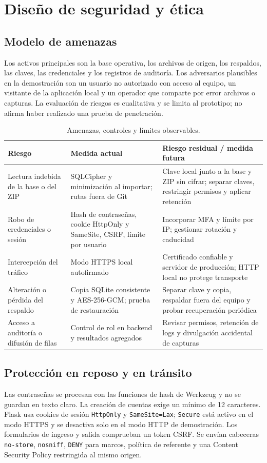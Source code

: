 \documentclass[12pt,a4paper]{article}
\begin{document}
\section{Diseño de seguridad y ética}
\subsection{Modelo de amenazas}
Los activos principales son la base operativa, los archivos de origen, los respaldos, las claves, las credenciales y los registros de auditoría. Los adversarios plausibles en la demostración son un usuario no autorizado con acceso al equipo, un visitante de la aplicación local y un operador que comparte por error archivos o capturas. La evaluación de riesgos es cualitativa y se limita al prototipo; no afirma haber realizado una prueba de penetración.

\begin{table}[H]
\centering\footnotesize
\begin{tabularx}{\textwidth}{P{2.7cm}Y Y}
\toprule
Riesgo & Medida actual & Riesgo residual / medida futura\\
\midrule
Lectura indebida de la base o del ZIP & SQLCipher y minimización al importar; rutas fuera de Git & Clave local junto a la base y ZIP sin cifrar; separar claves, restringir permisos y aplicar retención\\
Robo de credenciales o sesión & Hash de contraseñas, cookie HttpOnly y SameSite, CSRF, límite por usuario & Incorporar MFA y límite por IP; gestionar rotación y caducidad\\
Intercepción del tráfico & Modo HTTPS local autofirmado & Certificado confiable y servidor de producción; HTTP local no protege transporte\\
Alteración o pérdida del respaldo & Copia SQLite consistente y AES-256-GCM; prueba de restauración & Separar clave y copia, respaldar fuera del equipo y probar recuperación periódica\\
Acceso a auditoría o difusión de filas & Control de rol en backend y resultados agregados & Revisar permisos, retención de logs y divulgación accidental de capturas\\
\bottomrule
\end{tabularx}
\caption{Amenazas, controles y límites observables.}
\end{table}

\subsection{Protección en reposo y en tránsito}
Las contraseñas se procesan con las funciones de hash de Werkzeug y no se guardan en texto claro. La creación de cuentas exige un mínimo de 12 caracteres. Flask usa cookies de sesión \texttt{HttpOnly} y \texttt{SameSite=Lax}; \texttt{Secure} está activo en el modo HTTPS y se desactiva solo en el modo HTTP de demostración. Los formularios de ingreso y salida comprueban un token CSRF. Se envían cabeceras \texttt{no-store}, \texttt{nosniff}, \texttt{DENY} para marcos, política de referente y una Content Security Policy restringida al mismo origen.
\end{document}
